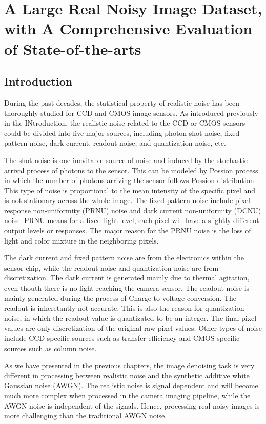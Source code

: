%
\chapter{A Large Real Noisy Image Dataset, with A Comprehensive Evaluation of State-of-the-arts}
\label{sec:dataset}

\section{Introduction}

During the past decades, the statistical property of realistic noise has been thoroughly studied for CCD and CMOS image sensors. As introduced previously in the INtroduction, the realistic noise related to the CCD or CMOS sensors could be divided into five major sources, including photon shot noise, fixed pattern noise, dark current, readout noise, and quantization noise, etc.

The shot noise is one inevitable source of noise and induced by the stochastic arrival process of photons to the sensor. This can be modeled by Possion process in which the number of photons arriving the sensor follows Possion distribution. This type of noise is proportional to the mean intensity of the specific pixel and is not stationary across the whole image. The fixed pattern noise include pixel response non-uniformity (PRNU) noise and dark current non-uniformity (DCNU) noise. PRNU means for a fixed light level, each pixel will have a slightly different output levels or responses. The major reason for the PRNU noise is the loss of light and color mixture in the neighboring pixels.

The dark current and fixed pattern noise are from the electronics within the sensor chip, while the readout noise and quantization noise are from discretization. The dark current is generated mainly  due to thermal agitation, even thouth there is no light reaching the camera sensor. The readout noise is mainly generated during the process of Charge-to-voltage conversion. The readout is inheretantly not accurate. This is also the reason for quantization noise, in which the readout value is quantizated to be an integer. The final pixel values are only discretization of the original raw pixel values. Other types of noise include CCD specific sources such as transfer efficiency and CMOS specific sources such as column noise.

As we have presented in the previous chapters, the image denoising task is very different in processing between realistic noise and the synthetic additive white Gaussian noise (AWGN). The realistic noise is signal dependent and will become much more complex when processed in the camera imaging pipeline, while the AWGN noise is independent of the signals. Hence, processing real noisy images is more challenging than the traditional AWGN noise.

